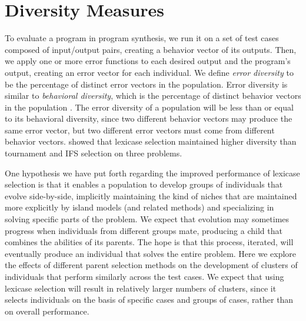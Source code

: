 \section{Diversity Measures}


To evaluate a program in program synthesis, we run it on a set of test cases composed of input/output pairs, creating a behavior vector of its outputs. Then, we apply one or more error functions to each desired output and the program's output, creating an error vector for each individual. We define \textit{error diversity} to be the percentage of distinct error vectors in the population. Error diversity is similar to \textit{behavioral diversity}, which is the percentage of distinct behavior vectors in the population \citep{Jackson:2010:PPSN}. The error diversity of a population will be less than or equal to its behavioral diversity, since two different behavior vectors may produce the same error vector, but two different error vectors must come from different behavior vectors.
\cite{Helmuth:2014:ieeeTEC} showed that lexicase selection maintained higher diversity than tournament and IFS selection on three problems.

One hypothesis we have put forth regarding the improved performance of lexicase selection is that it enables a population to develop groups of individuals that evolve side-by-side, implicitly maintaining the kind of niches that are maintained more explicitly by island models (and related methods) and specializing in solving specific parts of the problem. We expect that evolution may sometimes progress when individuals from different groups mate, producing a child that combines the abilities of its parents. The hope is that this process, iterated, will eventually produce an individual that solves the entire problem. Here we explore the effects of different parent selection methods on the development of clusters of individuals that perform similarly across the test cases. We expect that using lexicase selection will result in relatively larger numbers of clusters, since it selects individuals on the basis of specific cases and groups of cases, rather than on overall performance.

